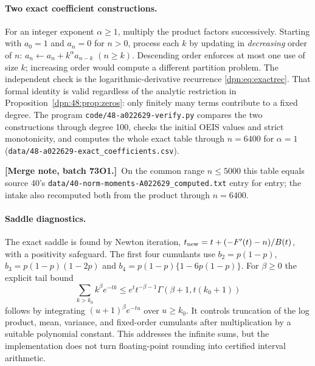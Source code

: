 \documentclass[11pt]{article}
\numberwithin{equation}{section}
\theoremstyle{definition}\newtheorem{definition}[theorem]{Definition}
\theoremstyle{remark}\newtheorem{remark}[theorem]{Remark}
\newcommand{\mergenote}[1]{\par\smallskip\noindent\textbf{[Merge note, batch 73O1.]}\ #1\par\smallskip}
\newcommand{\file}[1]{\nolinkurl{#1}}
\begin{document}
\paragraph{Two exact coefficient constructions.}
For an integer exponent $\alpha\ge1$, multiply the product factors
successively.  Starting with $a_0=1$ and $a_n=0$ for $n>0$, process each $k$ by
updating in \emph{decreasing} order of $n$:
$a_n\leftarrow a_n+k^\alpha a_{n-k}$ $(n\ge k)$.  Descending order enforces at
most one use of size $k$; increasing order would compute a different
partition problem.  The independent check is the logarithmic-derivative
recurrence \eqref{dpn:eq:exactrec}.  That formal identity is valid regardless
of the analytic restriction in Proposition~\ref{dpn:48:prop:zeros}: only
finitely many terms contribute to a fixed degree.  The program
\file{code/48-a022629-verify.py} compares the two constructions through degree
100, checks the initial OEIS values and strict monotonicity, and computes the
whole exact table through $n=6400$ for $\alpha=1$
(\file{data/48-a022629-exact_coefficients.csv}).
\mergenote{On the common range $n\le5000$ this table equals source 40's
\file{data/40-norm-moments-A022629_computed.txt} entry for entry; the intake
also recomputed both from the product through $n=6400$.}

\paragraph{Saddle diagnostics.}
The exact saddle is found by Newton iteration,
$t_{\rm new}=t+(-F'(t)-n)/B(t)$, with a positivity safeguard.  The first four
cumulants use $b_2=p(1-p)$, $b_3=p(1-p)(1-2p)$ and
$b_4=p(1-p)\{1-6p(1-p)\}$.  For $\beta\ge0$ the explicit tail bound
\begin{equation}\label{dpn:48:eq:numerictail}
 \sum_{k>k_0}k^\beta e^{-tk}
 \le e^tt^{-\beta-1}\Gamma(\beta+1,t(k_0+1))
\end{equation}
follows by integrating $(u+1)^\beta e^{-tu}$ over $u\ge k_0$.  It controls
truncation of the log product, mean, variance, and fixed-order cumulants after
multiplication by a suitable polynomial constant.  This addresses the infinite
sums, but the implementation does not turn floating-point rounding into
certified interval arithmetic.
\end{document}
